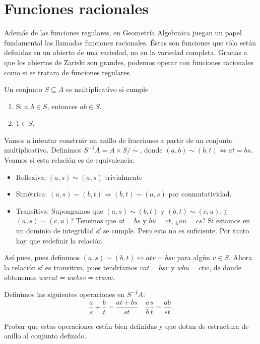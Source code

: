 \documentclass[ACGA.tex]{subfiles}
\begin{document}
\section{Funciones racionales}

Además de las funciones regulares, en Geometría Algebraica juegan un papel fundamental las llamadas funciones racionales. Éstas son funciones que sólo están definidas en un abierto de una variedad, no en la variedad completa. Gracias a que los abiertos de Zariski son grandes, podemos operar con funciones racionales como si se tratara de funciones regulares.

\begin{defi}
Un conjunto $S\subseteq A$ es multiplicativo si cumple
\begin{enumerate}
\item Si $a,b\in S$, entonces $ab\in S$.
\item $1\in S$.
\end{enumerate}
\end{defi}

Vamos a intentar construir un anillo de fracciones a partir de un conjunto multiplicativo. Definimos $S^{-1}A=A\times S/\sim$, donde $(a,b)\sim (b,t)\Leftrightarrow at=bs$. Veamos si esta relación es de equivalencia:
\begin{itemize}
\item Reflexiva: $(a,s)\sim (a,s)$ trivialmente
\item Simétrica: $(a,s)\sim (b,t)\Rightarrow (b,t)\sim (a,s)$ por conmutatividad.
\item Transitiva: Supongamos que $(a,s)\sim (b,t)$ y $(b,t)\sim (c,u)$, ¿$(a,s)\sim (c,u)$? Tenemos que $at=bs$ y $bu=ct$, ¿$au=cs$? Si estamos en un dominio de integridad sí se cumple. Pero esto no es suficiente. Por tanto hay que redefinir la relación.
\end{itemize}

Así pues, pues definimos $(a,s)\sim (b,t)\Leftrightarrow atv=bsv$ para algún $v\in S$. Ahora la relación sí es transitiva, pues tendríamos $vat=bsv$ y $wbu=ctw$, de donde obtenemos $uwvat=uwbsv=ctwsv$. 

Definimos las siguientes operaciones en $S^{-1}A$:
$$\frac{a}{s}+\frac{b}{t}=\frac{at+bs}{st}\quad \frac{a}{b}\frac{s}{t}=\frac{ab}{st}.$$

\begin{ejer}
Probar que estas operaciones están bien definidas y que dotan de estructura de anillo al conjunto definido.
\end{ejer}
\end{document}

